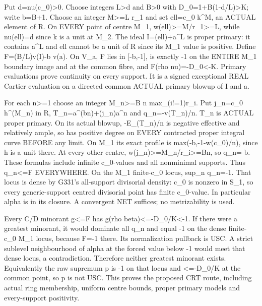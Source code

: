 Put d=nu(c\_0)\textgreater{}0. Choose integers L\textgreater{}d and B\textgreater{}0 with D\_0=1+B(1-d/L)\textgreater{}K; write b=B+1. Choose an integer M\textgreater{}=L r\_1 and set ell=c\_0 k\textasciicircum{}M, an ACTUAL element of R. On EVERY point of centre M\_1, w(ell)\textgreater{}=M/r\_1\textgreater{}=L, while nu(ell)=d since k is a unit at M\_2. The ideal I=(ell)+a\textasciicircum{}L is proper primary: it contains a\textasciicircum{}L and ell cannot be a unit of R since its M\_1 value is positive. Define F=(B/L)v(I)-b v(a). On V\_a, F lies in [-b,-1], is exactly -1 on the ENTIRE M\_1 boundary image and at the common fibre, and F(rho nu)=-D\_0\textless{}-K. Primary evaluations prove continuity on every support. It is a signed exceptional REAL Cartier evaluation on a directed common ACTUAL primary blowup of I and a.

For each n\textgreater{}=1 choose an integer M\_n\textgreater{}=B n max\_(i!=1)r\_i. Put j\_n=c\_0 h\textasciicircum{}(M\_n) in R, T\_n=a\textasciicircum{}(bn)+(j\_n)a\textasciicircum{}n and q\_n=-v(T\_n)/n. T\_n is ACTUAL proper primary. On its actual blowup, -E\_(T\_n)/n is negative effective and relatively ample, so has positive degree on EVERY contracted proper integral curve BEFORE any limit. On M\_1 its exact profile is max(-b,-1-w(c\_0)/n), since h is a unit there. At every other centre, w(j\_n)\textgreater{}=M\_n/r\_i\textgreater{}=Bn, so q\_n=-b. These formulas include infinite c\_0-values and all nonminimal supports. Thus q\_n\textless{}=F EVERYWHERE. On the M\_1 finite-c\_0 locus, sup\_n q\_n=-1. That locus is dense by G331's all-support divisorial density: c\_0 is nonzero in S\_1, so every generic-support centred divisorial point has finite c\_0-value. In particular alpha is in its closure. A convergent NET suffices; no metrizability is used.

Every C/D minorant g\textless{}=F has g(rho beta)\textless{}=-D\_0/K\textless{}-1. If there were a greatest minorant, it would dominate all q\_n and equal -1 on the dense finite-c\_0 M\_1 locus, because F=-1 there. Its normalization pullback is USC. A strict sublevel neighbourhood of alpha at the forced value below -1 would meet that dense locus, a contradiction. Therefore neither greatest minorant exists. Equivalently the raw supremum p is -1 on that locus and \textless{}=-D\_0/K at the common point, so p is not USC. This proves the proposed CRT route, including actual ring membership, uniform centre bounds, proper primary models and every-support positivity.

